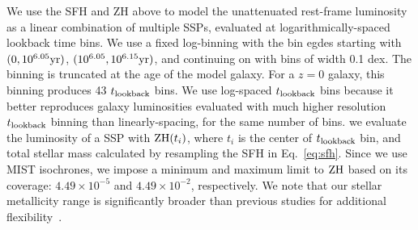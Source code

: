 We use the SFH and ZH above to model the unattenuated rest-frame luminosity as
a linear combination of multiple SSPs, evaluated at logarithmically-spaced
lookback time bins.
We use a fixed log-binning with the bin egdes starting with $(0, 10^{6.05}{\rm
yr})$, $(10^{6.05}, 10^{6.15}{\rm yr})$, and continuing on with bins of width
0.1 dex.
The binning is truncated at the age of the model galaxy. 
For a $z=0$ galaxy, this binning produces 43 $t_{\rm lookback}$ bins.
We use log-spaced $t_{\rm lookback}$ bins because it better reproduces galaxy luminosities
evaluated with much higher resolution $t_{\rm lookback}$ binning than linearly-spacing, for
the same number of bins. 
we evaluate the luminosity of a SSP with ${\rm ZH}(t_i)$, where $t_i$ is the
center of $t_{\rm lookback}$ bin, and total stellar mass calculated by resampling the SFH
in Eq.~\ref{eq:sfh}. 
Since we use MIST isochrones, we impose a minimum and maximum limit to ${\rm
ZH}$ based on its coverage: $4.49\times10^{-5}$ and $4.49\times10^{-2}$,
respectively.
We note that our stellar metallicity range is significantly broader than
previous studies for additional flexibility~\citep[\emph{e.g.}][]{carnall2017,
leja2017, tacchella2021}. 

